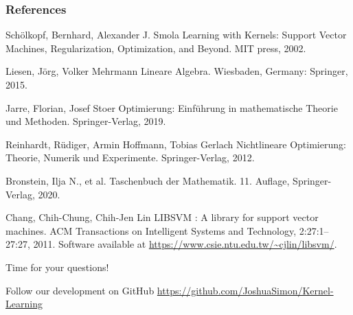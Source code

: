 \documentclass{beamer}
\begin{document}

\begin{frame}
    \frametitle{References}
    \footnotesize{
        \begin{thebibliography}{99} %
             Schölkopf, Bernhard, Alexander J. Smola
            \newblock Learning with Kernels: Support Vector Machines, Regularization, Optimization, and Beyond. MIT press, 2002.

             Liesen, Jörg, Volker Mehrmann
            \newblock Lineare Algebra. Wiesbaden, Germany: Springer, 2015.

             Jarre, Florian, Josef Stoer
            \newblock Optimierung: Einführung in mathematische Theorie und Methoden. Springer-Verlag, 2019.

             Reinhardt, Rüdiger, Armin Hoffmann, Tobias Gerlach
            \newblock Nichtlineare Optimierung: Theorie, Numerik und Experimente. Springer-Verlag, 2012.

              Bronstein, Ilja N., et al. 
            \newblock Taschenbuch der Mathematik. 11. Auflage, Springer-Verlag, 2020.

             Chang, Chih-Chung, Chih-Jen Lin
            \newblock LIBSVM : A library for support vector machines. ACM Transactions on Intelligent Systems and Technology, 2:27:1--27:27, 2011. Software available at \url{https://www.csie.ntu.edu.tw/~cjlin/libsvm/}.

        \end{thebibliography}
    }
\end{frame}


\begin{frame}
    \Huge{\centerline{Time for your questions!}}
    \bigskip
    \bigskip
    \bigskip
    \bigskip

    \normalsize
    \centering
    Follow our development on GitHub  
    \url{https://github.com/JoshuaSimon/Kernel-Learning}
    
\end{frame}

\end{document}
